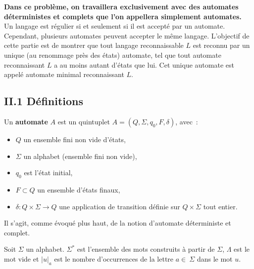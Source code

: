 \documentclass[11pt,a4paper]{article}\nofiles
\begin{document}
\textbf{Dans ce probl\`eme, on travaillera exclusivement avec des automates d\'eterministes et complets que l'on appellera simplement automates.}\\

Un langage est r\'egulier si et seulement si il est accept\'e par un automate.
Cependant, plusieurs automates peuvent accepter le m\^eme langage. 
L'objectif de cette partie est de montrer que tout langage reconnaissable $L$ est reconnu par un unique (au renommage pr\`es des \'etats) automate, tel que tout automate reconnaissant $L$ a au moins autant d'\'etats que lui. 
Cet unique automate est appel\'e automate minimal reconnaissant $L$.

\subsection*{II.1 D\'efinitions}
Un \textbf{automate} $A$ est un quintuplet $A=(Q,\Sigma,q_0,F,\delta)$, avec~:
\begin{itemize}
\item $Q$ un ensemble fini non vide d'\'etats,
\item $\Sigma$ un alphabet (ensemble fini non vide),
\item $q_0$ est l'\'etat initial,
\item $F\subset Q$ un ensemble d'\'etats finaux,
\item $\delta : Q\times \Sigma \to Q$ une application de transition d\'efinie sur $Q\times \Sigma$ tout entier.
\end{itemize}
Il s'agit, comme \'evoqu\'e plus haut, de la notion d'automate d\'eterministe et complet.
\vskip3mm

Soit $\Sigma$ un alphabet. $\Sigma^*$ est l'ensemble des mots construits \`a partir de $\Sigma$, $\Lambda$ est le mot vide et $|u|_a$ est le nombre d'occurrences de la lettre $a\in~\Sigma$ dans le mot $u$.
\vskip3mm
\end{document}
